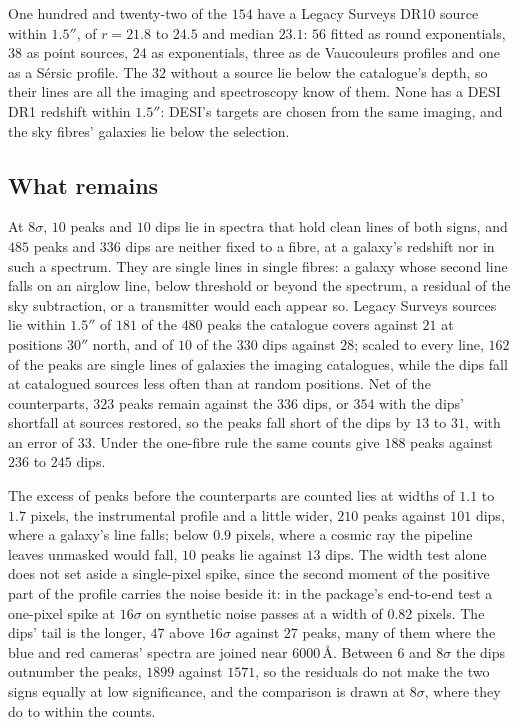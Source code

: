 \documentclass[3p,11pt]{elsarticle}
\begin{document}
One hundred and twenty-two of the $154$ have a Legacy Surveys DR10 source within
$1.5''$, of $r=21.8$ to $24.5$ and median $23.1$: $56$ fitted as round exponentials, $38$
as point sources, $24$ as exponentials, three as de Vaucouleurs profiles and one as a
S\'ersic profile. The $32$ without a source lie below the catalogue's depth, so their
lines are all the imaging and spectroscopy know of them. None has a DESI DR1 redshift
within $1.5''$: DESI's targets are chosen from the same imaging, and the sky fibres'
galaxies lie below the selection.

\subsection{What remains}

At $8\sigma$, $10$ peaks and $10$ dips lie in spectra that hold clean lines of both signs,
and $485$ peaks and $336$ dips are neither fixed to a fibre, at a galaxy's redshift nor in
such a spectrum. They are single lines in single fibres: a galaxy whose second line falls
on an airglow line, below threshold or beyond the spectrum, a residual of the sky
subtraction, or a transmitter would each appear so. Legacy Surveys sources lie within
$1.5''$ of $181$ of the $480$ peaks the catalogue covers against $21$ at positions $30''$
north, and of $10$ of the $330$ dips against $28$; scaled to every line, $162$ of the
peaks are single lines of galaxies the imaging catalogues, while the dips fall at
catalogued sources less often than at random positions. Net of the counterparts, $323$
peaks remain against the $336$ dips, or $354$ with the dips' shortfall at sources
restored, so the peaks fall short of the dips by $13$ to $31$, with an error of $33$.
Under the one-fibre rule the same counts give $188$ peaks against $236$ to $245$ dips.

The excess of peaks before the counterparts are counted lies at widths of $1.1$ to
$1.7$ pixels, the instrumental profile and a little wider, $210$ peaks against $101$
dips, where a galaxy's line falls; below $0.9$ pixels, where a cosmic ray the pipeline
leaves unmasked would fall, $10$ peaks lie against $13$ dips. The width test alone does
not set aside a single-pixel spike, since the second moment of the positive part of the
profile carries the noise beside it: in the package's end-to-end test a one-pixel spike
at $16\sigma$ on synthetic noise passes at a width of $0.82$ pixels. The dips' tail is
the longer, $47$ above $16\sigma$ against $27$ peaks, many of them where the blue and
red cameras' spectra are joined near $6000$\,\AA. Between $6$ and $8\sigma$ the dips
outnumber the peaks, $1899$ against $1571$, so the residuals do not make the two signs
equally at low significance, and the comparison is drawn at $8\sigma$, where they do to
within the counts.
\end{document}

